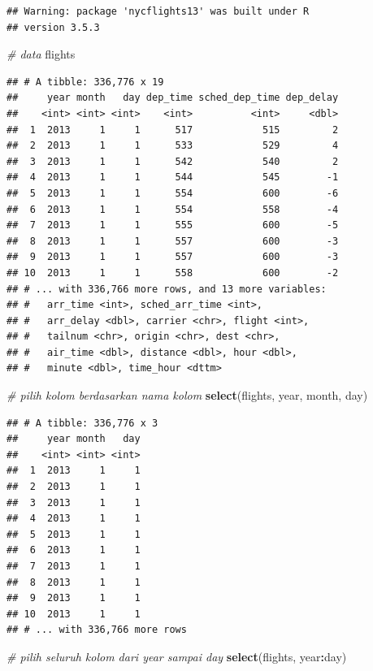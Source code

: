 \documentclass[]{book}
\newenvironment{Shaded}{\begin{snugshade}}{\end{snugshade}}
\newcommand{\KeywordTok}[1]{\textcolor[rgb]{0.13,0.29,0.53}{\textbf{#1}}}
\newcommand{\CommentTok}[1]{\textcolor[rgb]{0.56,0.35,0.01}{\textit{#1}}}
\newcommand{\OperatorTok}[1]{\textcolor[rgb]{0.81,0.36,0.00}{\textbf{#1}}}
\newcommand{\NormalTok}[1]{#1}
\begin{document}
\begin{verbatim}
## Warning: package 'nycflights13' was built under R
## version 3.5.3
\end{verbatim}

\begin{Shaded}
\begin{Highlighting}[]
\CommentTok{# data}
\NormalTok{flights}
\end{Highlighting}
\end{Shaded}

\begin{verbatim}
## # A tibble: 336,776 x 19
##     year month   day dep_time sched_dep_time dep_delay
##    <int> <int> <int>    <int>          <int>     <dbl>
##  1  2013     1     1      517            515         2
##  2  2013     1     1      533            529         4
##  3  2013     1     1      542            540         2
##  4  2013     1     1      544            545        -1
##  5  2013     1     1      554            600        -6
##  6  2013     1     1      554            558        -4
##  7  2013     1     1      555            600        -5
##  8  2013     1     1      557            600        -3
##  9  2013     1     1      557            600        -3
## 10  2013     1     1      558            600        -2
## # ... with 336,766 more rows, and 13 more variables:
## #   arr_time <int>, sched_arr_time <int>,
## #   arr_delay <dbl>, carrier <chr>, flight <int>,
## #   tailnum <chr>, origin <chr>, dest <chr>,
## #   air_time <dbl>, distance <dbl>, hour <dbl>,
## #   minute <dbl>, time_hour <dttm>
\end{verbatim}

\begin{Shaded}
\begin{Highlighting}[]
\CommentTok{# pilih kolom berdasarkan nama kolom}
\KeywordTok{select}\NormalTok{(flights, year, month, day)}
\end{Highlighting}
\end{Shaded}

\begin{verbatim}
## # A tibble: 336,776 x 3
##     year month   day
##    <int> <int> <int>
##  1  2013     1     1
##  2  2013     1     1
##  3  2013     1     1
##  4  2013     1     1
##  5  2013     1     1
##  6  2013     1     1
##  7  2013     1     1
##  8  2013     1     1
##  9  2013     1     1
## 10  2013     1     1
## # ... with 336,766 more rows
\end{verbatim}

\begin{Shaded}
\begin{Highlighting}[]
\CommentTok{# pilih seluruh kolom dari year sampai day}
\KeywordTok{select}\NormalTok{(flights, year}\OperatorTok{:}\NormalTok{day)}
\end{Highlighting}
\end{Shaded}
\end{document}
